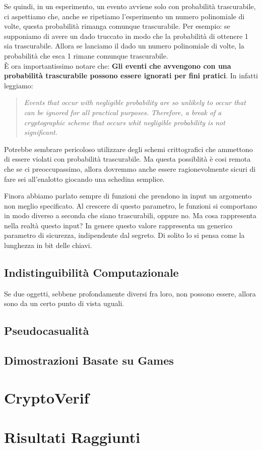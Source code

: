 \documentclass[a4paper,openright,twoside,12pt]{report}
\begin{document}
Se quindi, in un esperimento, un evento avviene solo con probabilit\`a trascurabile, ci aspettiamo che, anche se ripetiamo l'esperimento un numero polinomiale di volte, questa probabilit\`a
rimanga comunque trascurabile. 
Per esempio: se supponiamo di avere un dado truccato in modo che la probabilit\`a di ottenere 1 sia trascurabile. Allora se lanciamo il dado un numero polinomiale di volte, la probabilit\`a
che esca 1 rimane comunque trascurabile.\\
\`E ora importantissimo notare che:
\textbf{Gli eventi che avvengono con una probabilit\`a trascurabile possono essere ignorati per fini pratici}.
In \cite{1206501} infatti leggiamo:
\begin{quotation}
\emph{Events that occur with negligible probability are so unlikely to occur that can be ignored for all practical purposes. Therefore,
a break of a cryptographic scheme that occurs whit negligible probability is not significant.}
\end{quotation}
Potrebbe sembrare pericoloso utilizzare degli schemi crittografici che ammettono di essere violati con probabilit\`a trascurabile. 
Ma questa possiblit\`a \`e cosi remota che se ci preoccupassimo, allora dovremmo anche essere ragionevolmente sicuri di fare sei all'enalotto giocando una schedina semplice.



Finora abbiamo parlato sempre di funzioni che prendono in input un argomento non meglio specificato. Al crescere di questo parametro, le funzioni si comportano in modo diverso a seconda che siano trascurabili, oppure no.
Ma cosa rappresenta nella realt\`a questo input?
In genere questo valore rappresenta un generico parametro di sicurezza, indipendente dal segreto. Di solito lo si pensa come la lunghezza in bit delle chiavi.


\newpage

\section{Indistinguibilit\`a Computazionale}
Se due oggetti, sebbene profondamente diversi fra loro, non possono essere, allora sono da un certo punto di vista uguali.

\section{Pseudocasualit\`a}

\section{Dimostrazioni Basate su Games}

\chapter{CryptoVerif}

\chapter{Risultati Raggiunti}

\lhead[\fancyplain{}{\bfseries\thepage}]{\fancyplain{}{\bfseries\rightmark}}
	
		
\end{document}

